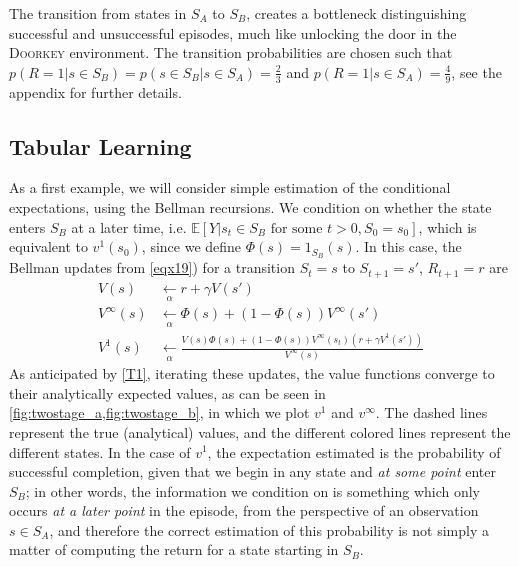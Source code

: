\documentclass[letterpaper]{article} %
\newcommand{\EE}{\mathbb{E}}
\newcommand{\doorkey}{\textsc{Doorkey}\xspace}
\begin{document}
	The transition from states in $S_A$ to $S_B$, creates a bottleneck distinguishing successful and unsuccessful episodes, much like unlocking the door in the \doorkey environment. The transition probabilities are chosen such that $p(R=1| s \in S_B) = p(s \in S_B | s \in S_A)  = \frac{2}{3}$ and $p(R=1 | s \in S_A) = \frac{4}{9}$, see the appendix for further details.






	\subsection{Tabular Learning} \label{sec32}%
	As a first example, we will consider simple estimation of the conditional expectations, using the Bellman recursions. We condition on whether the state enters $S_B$ at a later time, i.e. $\EE[Y| \mbox{$s_t \in S_B$ for some $t > 0$}, S_0 = s_0]$, which is equivalent to $v^1(s_0)$, since we define $\Phi(s) = 1_{S_B}(s)$. In this case, the Bellman updates from \cref{eqx19}) for a transition $S_t = s$ to $S_{t+1}=s'$, $R_{t+1} = r$ are
	\begin{align}
		V(s) & \underset{\alpha }{\leftarrow } r + \gamma V(s') \nonumber  \\%
		V^\infty(s) & \underset{\alpha}{\leftarrow } \Phi(s)  + (1-\Phi(s) ) V^\infty(s') \label{eq35b} \\
		\!\!V^{1}(s) & \underset{\alpha}{\leftarrow }
		\frac{
			V(s) \Phi(s)\! +\! (1\! -\! \Phi(s) )V^\infty(s_{t} ) \left(  r\! +\!  \gamma V^{1}(s' )  \right) }{ V^\infty(s) } \nonumber %
	\end{align}
	As anticipated by \cref{T1}, iterating these updates, the value functions converge to their analytically expected values, as can be seen in \cref{fig:twostage_a,fig:twostage_b}, in which we plot $v^1$ and $v^\infty$. The dashed lines represent the true (analytical) values, and the different colored lines represent the different states.
	In the case of $v^1$, the expectation estimated is the probability of successful completion, given that we begin in any state and \emph{at some point} enter $S_B$; in other words, the information we condition on is something which only occurs \emph{at a later point} in the episode, from the perspective of an observation $s\in S_A$, and therefore the correct estimation of this probability is not simply a matter of computing the return for a state starting in $S_B$. %
\end{document}

